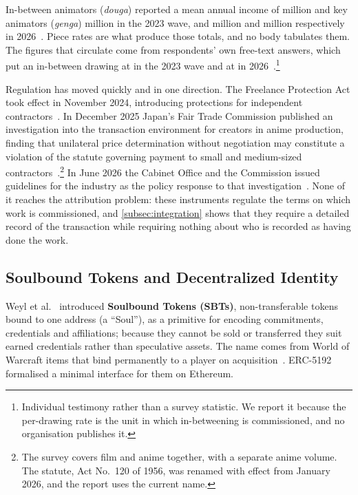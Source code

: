 In-between animators (\textit{douga}) reported a mean annual income of
 million and key animators (\textit{genga})  million in the
2023 wave, and  million and  million respectively in
2026~\cite{janica2023survey,janica2026survey}. Piece rates are what produce those
totals, and no body tabulates them. The figures that circulate come from respondents'
own free-text answers, which put an in-between drawing at  in the 2023 wave
and at  in
2026~\cite{janica2023survey,janica2026survey}.\footnote{Individual testimony rather
than a survey statistic. We report it because the per-drawing rate is the unit in which
in-betweening is commissioned, and no organisation publishes it.}

Regulation has moved quickly and in one direction. The Freelance Protection Act took
effect in November 2024, introducing protections for independent
contractors~\cite{meti2025anime}. In December 2025 Japan's Fair Trade Commission
published an investigation into the transaction environment for creators in anime
production, finding that unilateral price determination without negotiation may
constitute a violation of the statute governing payment to small and medium-sized
contractors~\cite{jftc2025anime}.\footnote{The survey covers film and anime together,
with a separate anime volume. The statute, Act No.~120 of 1956, was renamed with effect
from January 2026, and the report uses the current name.} In June 2026 the Cabinet
Office and the Commission issued guidelines for the industry as the policy response to
that investigation~\cite{jftc2026shishin}. None of it reaches the attribution problem:
these instruments regulate the terms on which work is commissioned, and
\cref{subsec:integration} shows that they require a detailed record of the transaction
while requiring nothing about who is recorded as having done the work.

\subsection{Soulbound Tokens and Decentralized Identity}
\label{subsec:sbt}

Weyl et al.~\cite{buterin2022decentralized} introduced \textbf{Soulbound Tokens
(SBTs)}, non-transferable tokens bound to one address (a ``Soul''), as a primitive for
encoding commitments, credentials and affiliations; because they cannot be sold or
transferred they suit earned credentials rather than speculative assets. The name comes
from World of Warcraft items that bind permanently to a player on
acquisition~\cite{buterin2022soulbound}. ERC-5192~\cite{daubenschuetz2022erc5192}
formalised a minimal interface for them on Ethereum.

